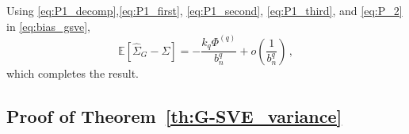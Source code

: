 \documentclass[12pt]{article}
\theoremstyle{remark}
\begin{document}
%
Using \eqref{eq:P1_decomp},\eqref{eq:P1_first}, \eqref{eq:P1_second}, \eqref{eq:P1_third}, and \eqref{eq:P_2} in \eqref{eq:bias_gsve},
\[
\mathbb{E} \left[\hat{\Sigma}_{G} - \Sigma \right] = -\dfrac{k_q \Phi^{(q)} }{b_n^q} + o\left( \dfrac{1}{b_n^q} \right)\,,
\]
which completes the result.
%

\subsection{Proof of Theorem~\ref{th:G-SVE_variance}}
\label{appendix:variance}
 
\end{document}
